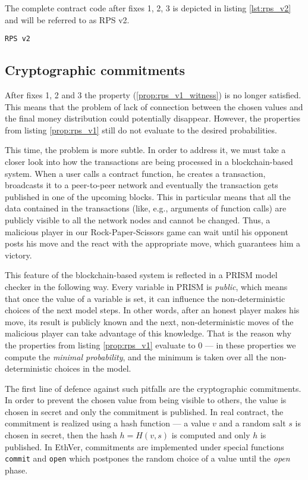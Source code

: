 The complete contract code after fixes 1, 2, 3 is depicted in listing \ref{lst:rps_v2} and will be referred to as RPS v2.

%
\begin{lstlisting}[caption=RPS v2, label=lst:rps_v2]
RPS v2
\end{lstlisting}

\subsection{Cryptographic commitments}

After fixes 1, 2 and 3 the property (\ref{prop:rps_v1_witness}) is no longer satisfied.
This means that the problem of lack of connection between the chosen values and the final money distribution
could potentially disappear.
However, the properties from listing \ref{prop:rps_v1} still do not evaluate to the desired probabilities.

This time, the problem is more subtle.
In order to address it, we must take a closer look into how the transactions are being processed
in a blockchain-based system.
When a user calls a contract function, he creates a transaction, broadcasts it to a peer-to-peer network and 
eventually the transaction gets published in one of the upcoming blocks.
This in particular means that all the data contained in the transactions (like, e.g., arguments of function calls)
are publicly visible to all the network nodes and cannot be changed.
Thus, a malicious player in our Rock-Paper-Scissors game can wait until his opponent posts his move and 
the react with the appropriate move, which guarantees him a victory.

This feature of the blockchain-based system is reflected in a PRISM model checker in the following way.
Every variable in PRISM is \emph{public}, which means that once the value of a variable is set, it can influence
the non-deterministic choices of the next model steps.
In other words, after an honest player makes his move, its result is publicly known and the next, non-deterministic
moves of the malicious player can take advantage of this knowledge.
That is the reason why the properties from listing \ref{prop:rps_v1} evaluate to 0 --- in these properties we compute the
\emph{minimal probability}, and the minimum is taken over all the non-deterministic choices in the model.

The first line of defence against such pitfalls are the cryptographic commitments.
In order to prevent the chosen value from being visible to others, the value is chosen in secret and only
the commitment is published.
In real contract, the commitment is realized using a hash function --- a value $v$ and a random salt $s$ is chosen
in secret, then the hash $h = H(v, s)$ is computed and only $h$ is published.
In EthVer, commitments are implemented under special functions \lstinline{commit} and \lstinline{open} which
postpones the random choice of a value until the \emph{open} phase.

